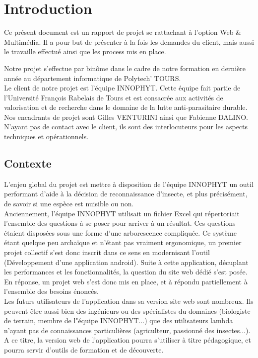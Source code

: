 \documentclass[twoside]{EPURapport}
\begin{document}
\chapter{Introduction}

Ce présent document est un rapport de projet se rattachant à l'option Web \& Multimédia. Il a pour but de présenter à la fois les demandes du client, mais aussi le travaille effectué ainsi que les process mis en place.
	
Notre projet s'effectue par binôme dans le cadre de notre formation en dernière année au département informatique de Polytech' TOURS.\\

Le client de notre projet est l'équipe INNOPHYT. Cette équipe fait partie de l'Université François Rabelais de Tours et est consacrée aux activités de valorisation et de recherche dans le domaine de la lutte anti-parasitaire durable. Nos encadrants de projet sont Gilles VENTURINI ainsi que Fabienne DALINO. N'ayant pas de contact avec le client, ils sont des interlocuteurs pour les aspects techniques et opérationnels.

	\section{Contexte}
	
	L'enjeu global du projet est mettre à disposition de l'équipe INNOPHYT un outil performant d'aide à la décision de reconnaissance d'insecte, et plus précisément, de savoir si une espèce est nuisible ou non.\\
	
	Anciennement, l'équipe INNOPHYT utilisait un fichier Excel qui répertoriait l'ensemble des questions à se poser pour arriver à un résultat. Ces questions étaient disposées sous une forme d'une arborescence compliquée. Ce système étant quelque peu archaïque et n'étant pas vraiment ergonomique, un premier projet collectif s'est donc inscrit dans ce sens en modernisant l'outil (Développement d'une application android). Suite à cette application, décuplant les performances et les fonctionnalités, la question du site web dédié s'est posée. En réponse, un projet web s'est donc mis en place, et à répondu partiellement à l'ensemble des besoins énoncés.\\
	
	Les futurs utilisateurs de l'application dans sa version site web sont nombreux. Ils peuvent être aussi bien des ingénieurs ou des spécialistes du domaines (biologiste de terrain, membre de l"équipe INNOPHYT...) que des utilisateurs lambda n'ayant pas de connaissances particulières (agriculteur, passionné des insectes...). A ce titre, la version web de l'application pourra s'utiliser à titre pédagogique, et pourra servir d'outils de formation et de découverte.	
	
\end{document}
